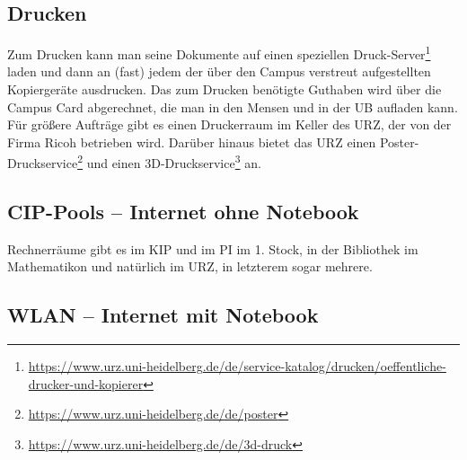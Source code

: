 
\vspace*{-2mm}
\subsection{Drucken}
\vspace*{-1mm}
Zum Drucken kann man seine Dokumente auf einen speziellen Druck-Server\footnote{\url{https://www.urz.uni-heidelberg.de/de/service-katalog/drucken/oeffentliche-drucker-und-kopierer}} laden und dann an (fast) jedem der über den Campus verstreut aufgestellten Kopiergeräte ausdrucken. Das zum Drucken benötigte Gut\-ha\-ben wird über die Campus Card abgerechnet, die man in den Mensen und in der \gls{UB} aufladen kann. Für größere Aufträge gibt es einen Druckerraum im Keller des \gls{URZ}, der von der Firma Ricoh betrieben wird. Darüber hinaus bietet das URZ einen Poster-Druckservice\footnote{\url{https://www.urz.uni-heidelberg.de/de/poster}} und einen 3D-Druckservice\footnote{\url{https://www.urz.uni-heidelberg.de/de/3d-druck}} an.

\vspace*{-2mm}
\subsection{CIP-Pools -- Internet ohne Notebook}
\vspace*{-1mm}
Rechnerräume gibt es im \gls{KIP} und im \gls{PI} im 1. Stock, in der Bibliothek im \gls{Mathematikon} und natürlich im \gls{URZ}, in letzterem sogar mehrere. 


\subsection{WLAN -- Internet mit Notebook}

